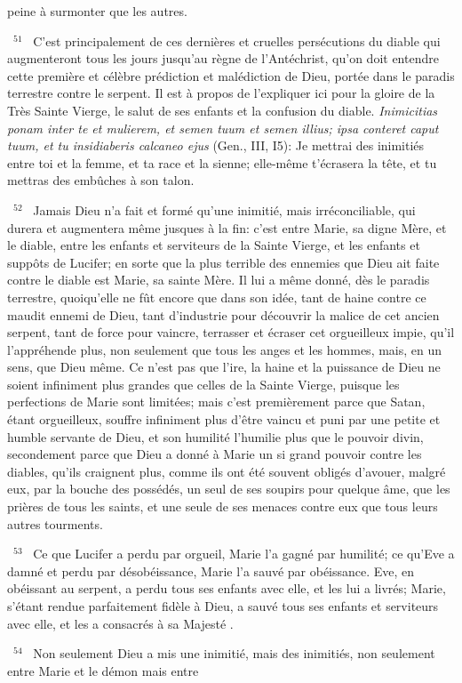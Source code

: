 \documentclass[paper=a5,pagesize=pdftex,fontsize=15pt,headinclude=on,twoside=off]{scrbook}
\newcommand{\negphantom}[1]{\settowidth{\dimen0}{#1}\hspace*{-\dimen0}}
\newcommand{\versenb}[1]{\par \vspace{10pt}~\negphantom{~${}^{#1}$~}${}^{#1}$~}
\newcommand{\latin}[1]{\emph{#1}}
\begin{document}
peine à surmonter que les autres.
\versenb{51} C'est principalement de ces dernières et cruelles persécutions du diable qui augmenteront tous les jours
jusqu'au règne de l'Antéchrist, qu'on doit entendre cette première et célèbre prédiction et malédiction de Dieu,
portée dans le paradis terrestre contre le serpent. Il est à propos de l'expliquer ici pour la gloire de la Très Sainte
Vierge, le salut de ses enfants et la confusion du diable.
\latin{Inimicitias ponam inter te et mulierem, et semen tuum et semen illius; ipsa conteret caput tuum, et tu insidiaberis
calcaneo ejus} (Gen., III, I5): Je mettrai des inimitiés entre toi et la femme, et ta race et la sienne; elle-même
t'écrasera la tête, et tu mettras des embûches à son talon.
\versenb{52} Jamais Dieu n'a fait et formé qu'une inimitié, mais irréconciliable, qui durera et augmentera même jusques à la
fin: c'est entre Marie, sa digne Mère, et le diable, entre les enfants et serviteurs de la Sainte Vierge, et les enfants
et suppôts de Lucifer; en sorte que la plus terrible des ennemies que Dieu ait faite contre le diable est Marie, sa
sainte Mère. Il lui a même donné, dès le paradis terrestre, quoiqu'elle ne fût encore que dans son idée, tant de
haine contre ce maudit ennemi de Dieu, tant d'industrie pour découvrir la malice de cet ancien serpent, tant de
force pour vaincre, terrasser et écraser cet orgueilleux impie, qu'il l'appréhende plus, non seulement que tous les
anges et les hommes, mais, en un sens, que Dieu même. Ce n'est pas que l'ire, la haine et la puissance de Dieu
ne soient infiniment plus grandes que celles de la Sainte Vierge, puisque les perfections de Marie sont limitées;
mais c'est premièrement parce que Satan, étant orgueilleux, souffre infiniment plus d'être vaincu et puni par une
petite et humble servante de Dieu, et son humilité l'humilie plus que le pouvoir divin, secondement parce que Dieu
a donné à Marie un si grand pouvoir contre les diables, qu'ils craignent plus, comme ils ont été souvent obligés
d'avouer, malgré eux, par la bouche des possédés, un seul de ses soupirs pour quelque âme, que les prières de
tous les saints, et une seule de ses menaces contre eux que tous leurs autres tourments.
\versenb{53} Ce que Lucifer a perdu par orgueil, Marie l'a gagné par humilité; ce qu'Eve a damné et perdu par
désobéissance, Marie l'a sauvé par obéissance. Eve, en obéissant au serpent, a perdu tous ses enfants avec elle,
et les lui a livrés; Marie, s'étant rendue parfaitement fidèle à Dieu, a sauvé tous ses enfants et serviteurs avec elle,
et les a consacrés à sa Majesté .
\versenb{54} Non seulement Dieu a mis une inimitié, mais des inimitiés, non seulement entre Marie et le démon mais entre
\end{document}
